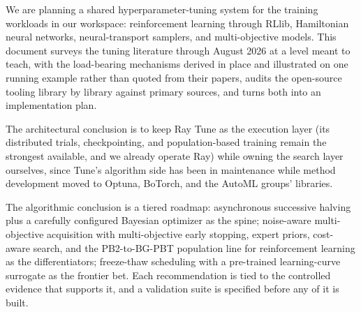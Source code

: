 We are planning a shared hyperparameter-tuning system for the training
workloads in our workspace: reinforcement learning through RLlib,
Hamiltonian neural networks, neural-transport samplers, and
multi-objective models. This document surveys the tuning literature
through August 2026 at a level meant to teach, with the load-bearing
mechanisms derived in place and illustrated on one running example
rather than quoted from their papers, audits the open-source tooling
library by library against primary sources, and turns both into an
implementation plan.

The architectural conclusion is to keep Ray Tune
as the execution layer (its distributed trials, checkpointing, and
population-based training remain the strongest available, and we already
operate Ray) while owning the search layer ourselves, since Tune's
algorithm side has been in maintenance while method development moved to
Optuna, BoTorch, and the AutoML groups' libraries.

The algorithmic
conclusion is a tiered roadmap: asynchronous successive halving plus a
carefully configured Bayesian optimizer as the spine; noise-aware
multi-objective acquisition with multi-objective early stopping, expert
priors, cost-aware search, and the PB2-to-BG-PBT population line for
reinforcement learning as the differentiators; freeze-thaw scheduling
with a pre-trained learning-curve surrogate as the frontier bet. Each
recommendation is tied to the controlled evidence that supports it, and
a validation suite is specified before any of it is built.
